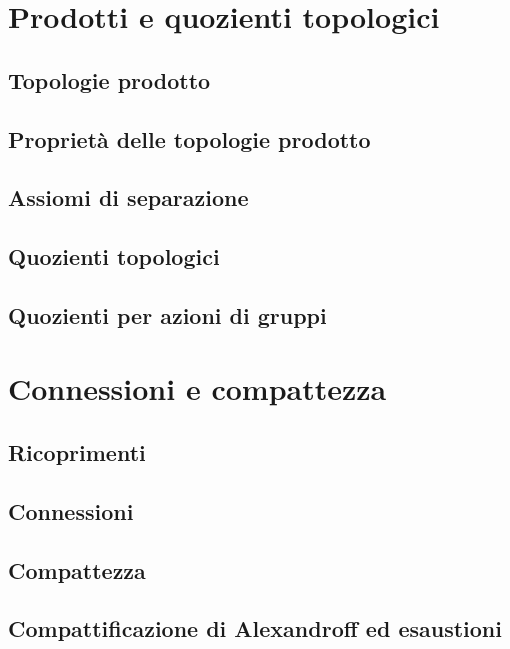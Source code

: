 \documentclass{article}
\begin{document}
\section{Prodotti e quozienti topologici}

\subsection{Topologie prodotto}


\subsection{Proprietà delle topologie prodotto}


\subsection{Assiomi di separazione}


\subsection{Quozienti topologici}


\subsection{Quozienti per azioni di gruppi}


\section{Connessioni e compattezza}

\subsection{Ricoprimenti}


\subsection{Connessioni}


\subsection{Compattezza}


\subsection{Compattificazione di Alexandroff ed esaustioni}

\end{document}
